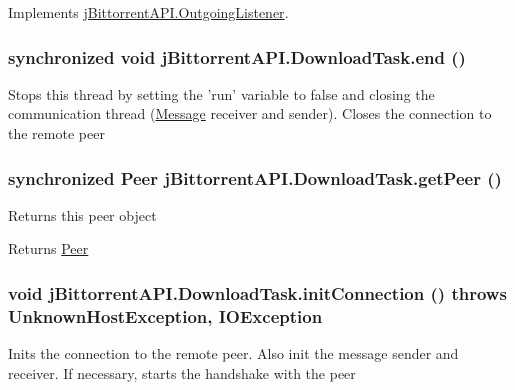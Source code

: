 Implements \hyperlink{interfacej_bittorrent_a_p_i_1_1_outgoing_listener_aede38edb5347290c7c7a234de14f208e}{jBittorrentAPI.OutgoingListener}.\hypertarget{classj_bittorrent_a_p_i_1_1_download_task_a914822d063b324e3a1fc8361d9ed67fa}{
\subsubsection[{end}]{\setlength{\rightskip}{0pt plus 5cm}synchronized void jBittorrentAPI.DownloadTask.end ()}}
\label{classj_bittorrent_a_p_i_1_1_download_task_a914822d063b324e3a1fc8361d9ed67fa}
Stops this thread by setting the 'run' variable to false and closing the communication thread (\hyperlink{classj_bittorrent_a_p_i_1_1_message}{Message} receiver and sender). Closes the connection to the remote peer \hypertarget{classj_bittorrent_a_p_i_1_1_download_task_acc97629e68b6c2cc0cdcf860907f4e09}{
\subsubsection[{getPeer}]{\setlength{\rightskip}{0pt plus 5cm}synchronized {\bf Peer} jBittorrentAPI.DownloadTask.getPeer ()}}
\label{classj_bittorrent_a_p_i_1_1_download_task_acc97629e68b6c2cc0cdcf860907f4e09}
Returns this peer object \begin{DoxyReturn}{Returns}
\hyperlink{classj_bittorrent_a_p_i_1_1_peer}{Peer} 
\end{DoxyReturn}
\hypertarget{classj_bittorrent_a_p_i_1_1_download_task_a0e6aae72189862d442f35a9a0d9953ff}{
\subsubsection[{initConnection}]{\setlength{\rightskip}{0pt plus 5cm}void jBittorrentAPI.DownloadTask.initConnection ()  throws UnknownHostException, IOException }}
\label{classj_bittorrent_a_p_i_1_1_download_task_a0e6aae72189862d442f35a9a0d9953ff}
Inits the connection to the remote peer. Also init the message sender and receiver. If necessary, starts the handshake with the peer 
